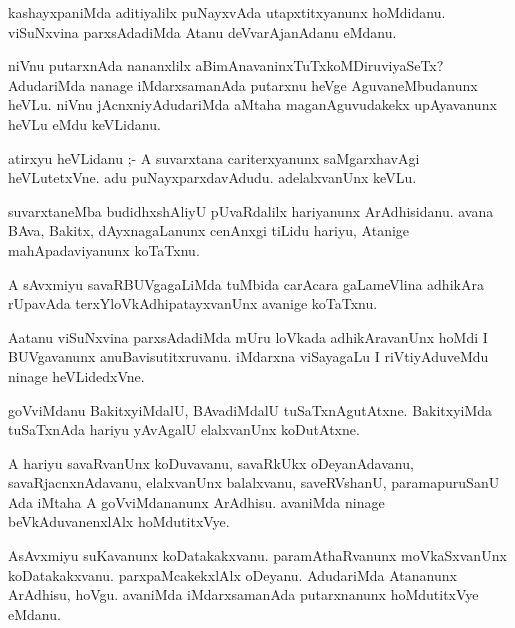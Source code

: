 \documentclass{article}
\begin{document}
\begin{mn}
kashayxpaniMda aditiyalilx puNayxvAda utapxtitxyanunx hoMdidanu. viSuNxvina 
parxsAdadiMda Atanu deVvarAjanAdanu eMdanu.
\end{mn}

\begin{mn}
niVnu putarxnAda  nananxlilx aBimAnavaninxTuTxkoMDiruviyaSeTx?  AdudariMda 
nanage iMdarxsamanAda putarxnu heVge AguvaneMbudanunx heVLu. niVnu 
jAcnxniyAdudariMda aMtaha maganAguvudakekx upAyavanunx heVLu eMdu keVLidanu.
\end{mn}

\begin{mn}
atirxyu heVLidanu ;- A suvarxtana cariterxyanunx saMgarxhavAgi heVLutetxVne.  
adu puNayxparxdavAdudu.  adelalxvanUnx keVLu.
\end{mn}

\begin{mn}
suvarxtaneMba budidhxshAliyU pUvaRdalilx hariyanunx ArAdhisidanu.  avana BAva, 
Bakitx, dAyxnagaLanunx cenAnxgi tiLidu hariyu, Atanige mahApadaviyanunx koTaTxnu.
\end{mn}

\begin{mn}
A sAvxmiyu savaRBUVgagaLiMda tuMbida carAcara gaLameVlina adhikAra rUpavAda 
terxYloVkAdhipatayxvanUnx avanige koTaTxnu. 
\end{mn}

\begin{mn}
Aatanu viSuNxvina parxsAdadiMda mUru loVkada adhikAravanUnx hoMdi I BUVgavanunx  
anuBavisutitxruvanu.  iMdarxna  viSayagaLu I riVtiyAduveMdu ninage heVLidedxVne.
\end{mn}

\begin{mn}
goVviMdanu  BakitxyiMdalU, BAvadiMdalU tuSaTxnAgutAtxne. BakitxyiMda tuSaTxnAda 
hariyu yAvAgalU elalxvanUnx koDutAtxne.
\end{mn}

\begin{mn}
A hariyu savaRvanUnx koDuvavanu, savaRkUkx oDeyanAdavanu, savaRjacnxnAdavanu,  
elalxvanUnx balalxvanu, saveRVshanU, paramapuruSanU Ada iMtaha A goVviMdananunx 
ArAdhisu.  avaniMda ninage beVkAduvanenxlAlx hoMdutitxVye.
\end{mn}

\begin{mn}
AsAvxmiyu suKavanunx koDatakakxvanu.  paramAthaRvanunx moVkaSxvanUnx koDatakakxvanu. 
parxpaMcakekxlAlx  oDeyanu. AdudariMda Atananunx  ArAdhisu,  hoVgu.  avaniMda 
iMdarxsamanAda putarxnanunx hoMdutitxVye eMdanu.
\end{mn}
\end{document}
